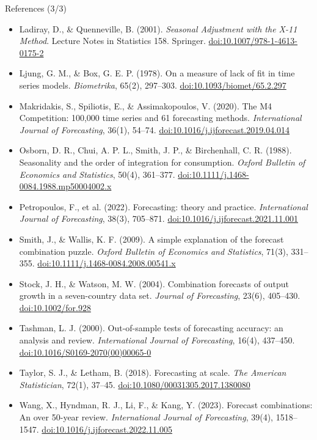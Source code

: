 \begin{frame}{References (3/3)}
\itemsize{\scriptsize}
\begin{itemize}
    \item Ladiray, D., \& Quenneville, B. (2001). \textit{Seasonal Adjustment with the X-11 Method}. Lecture Notes in Statistics 158. Springer. \href{https://doi.org/10.1007/978-1-4613-0175-2}{doi:10.1007/978-1-4613-0175-2}
    \item Ljung, G. M., \& Box, G. E. P. (1978). On a measure of lack of fit in time series models. \textit{Biometrika}, 65(2), 297--303. \href{https://doi.org/10.1093/biomet/65.2.297}{doi:10.1093/biomet/65.2.297}
    \item Makridakis, S., Spiliotis, E., \& Assimakopoulos, V. (2020). The M4 Competition: 100,000 time series and 61 forecasting methods. \textit{International Journal of Forecasting}, 36(1), 54--74. \href{https://doi.org/10.1016/j.ijforecast.2019.04.014}{doi:10.1016/j.ijforecast.2019.04.014}
    \item Osborn, D. R., Chui, A. P. L., Smith, J. P., \& Birchenhall, C. R. (1988). Seasonality and the order of integration for consumption. \textit{Oxford Bulletin of Economics and Statistics}, 50(4), 361--377. \href{https://doi.org/10.1111/j.1468-0084.1988.mp50004002.x}{doi:10.1111/j.1468-0084.1988.mp50004002.x}
    \item Petropoulos, F., et al. (2022). Forecasting: theory and practice. \textit{International Journal of Forecasting}, 38(3), 705--871. \href{https://doi.org/10.1016/j.ijforecast.2021.11.001}{doi:10.1016/j.ijforecast.2021.11.001}
    \item Smith, J., \& Wallis, K. F. (2009). A simple explanation of the forecast combination puzzle. \textit{Oxford Bulletin of Economics and Statistics}, 71(3), 331--355. \href{https://doi.org/10.1111/j.1468-0084.2008.00541.x}{doi:10.1111/j.1468-0084.2008.00541.x}
    \item Stock, J. H., \& Watson, M. W. (2004). Combination forecasts of output growth in a seven-country data set. \textit{Journal of Forecasting}, 23(6), 405--430. \href{https://doi.org/10.1002/for.928}{doi:10.1002/for.928}
    \item Tashman, L. J. (2000). Out-of-sample tests of forecasting accuracy: an analysis and review. \textit{International Journal of Forecasting}, 16(4), 437--450. \href{https://doi.org/10.1016/S0169-2070(00)00065-0}{doi:10.1016/S0169-2070(00)00065-0}
    \item Taylor, S. J., \& Letham, B. (2018). Forecasting at scale. \textit{The American Statistician}, 72(1), 37--45. \href{https://doi.org/10.1080/00031305.2017.1380080}{doi:10.1080/00031305.2017.1380080}
    \item Wang, X., Hyndman, R. J., Li, F., \& Kang, Y. (2023). Forecast combinations: An over 50-year review. \textit{International Journal of Forecasting}, 39(4), 1518--1547. \href{https://doi.org/10.1016/j.ijforecast.2022.11.005}{doi:10.1016/j.ijforecast.2022.11.005}
\end{itemize}
\end{frame}


